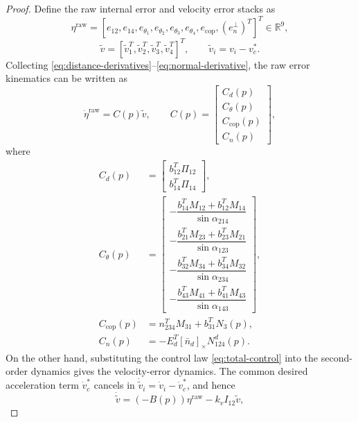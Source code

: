 \documentclass[letterpaper,journal]{IEEEtran}
\theoremstyle{plain}
\theoremstyle{definition}
\theoremstyle{remark}
\begin{document}
\begin{proof}
Define the raw internal error and velocity error stacks as
\begin{equation}
\eta^{\mathrm{raw}}=[e_{12},e_{14},e_{\theta_1},e_{\theta_2},e_{\theta_3},e_{\theta_4},e_{\mathrm{cop}},(e_n^\perp)^T]^T\in\mathbb R^9,
\label{eq:raw-eta}
\end{equation}
\begin{equation}
\tilde v=[\tilde v_1^T,\tilde v_2^T,\tilde v_3^T,\tilde v_4^T]^T,
\qquad \tilde v_i=v_i-v_c^*.
\label{eq:tilde-v-stack}
\end{equation}
Collecting \eqref{eq:distance-derivatives}--\eqref{eq:normal-derivative}, the raw error kinematics can be written as
\begin{equation}
\dot\eta^{\mathrm{raw}}=C(p)\tilde v,
\qquad
C(p)=
\begin{bmatrix}
C_d(p)\\
C_\theta(p)\\
C_{\mathrm{cop}}(p)\\
C_n(p)
\end{bmatrix},
\label{eq:raw-kinematics}
\end{equation}
where
\begin{align}
C_d(p)&=
\begin{bmatrix}
b_{12}^T\Pi_{12}\\
b_{14}^T\Pi_{14}
\end{bmatrix},\label{eq:Cd-def}\\
C_\theta(p)&=
\begin{bmatrix}
-\dfrac{b_{14}^{T}M_{12}+b_{12}^{T}M_{14}}{\sin\alpha_{214}}\\[4pt]
-\dfrac{b_{21}^{T}M_{23}+b_{23}^{T}M_{21}}{\sin\alpha_{123}}\\[4pt]
-\dfrac{b_{32}^{T}M_{34}+b_{34}^{T}M_{32}}{\sin\alpha_{234}}\\[4pt]
-\dfrac{b_{43}^{T}M_{41}+b_{41}^{T}M_{43}}{\sin\alpha_{143}}
\end{bmatrix},\label{eq:Ctheta-def}\\
C_{\mathrm{cop}}(p)&=n_{234}^TM_{31}+b_{31}^TN_3(p),\label{eq:Ccop-def}\\
C_n(p)&=-E_d^T[\bar n_d]_\times N_{124}^{d}(p).\label{eq:Cn-def}
\end{align}
On the other hand, substituting the control law \eqref{eq:total-control} into the second-order dynamics gives the velocity-error dynamics. The common desired acceleration term \(\dot v_c^*\) cancels in \(\dot{\tilde v}_i=\dot v_i-\dot v_c^*\), and hence
\begin{equation}
\dot{\tilde v}=(-B(p))\eta^{\mathrm{raw}}-k_vI_{12}\tilde v,

\end{equation}
\end{proof}
\end{document}
